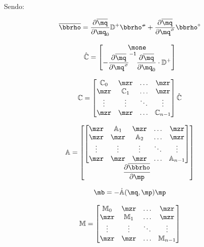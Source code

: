 \documentclass[a4paper,11pt,brazil,fleqn]{article}
\begin{document}
Sendo:

\begin{equation} \label{eq:VinculosVelocidades}
\overline{\mrho} = \frac{\partial \overline{\mq}}{\partial \mq_0} \mD^+ \mrho\ssh + \frac{\partial \overline{\mq}}{\partial \mq\hcir}  \mrho\cir
\end{equation}

\begin{equation} \label{eq:MatrizCchapeu}
\hat{\mC} = \begin{bmatrix}
\mone \\
- \displaystyle\frac{\partial \overline{\mq}}{\partial \mq\hcir}^\msI  \frac{\partial \overline{\mq}}{\partial \mq_0 }\cdot\mD^+
\end{bmatrix}
\end{equation}

\begin{equation} \label{eq:MatrizC2}
\mC = 
\begin{bmatrix}
\mC_0 &  \mzr  & \ldots & \mzr\\
\mzr  &  \mC_1 & \ldots & \mzr\\
\vdots & \vdots & \ddots & \vdots\\
\mzr  &   \mzr       &\ldots & \mC_{n-1}
\end{bmatrix}
\hat{\mC}
\end{equation}

\begin{equation} \label{eq:MatrizA2}
\mA = 
\begin{bmatrix}
\begin{bmatrix}
\mzr &  \mA_1  & \mzr & \ldots & \mzr\\
\mzr  &  \mzr & \mA_2 & \ldots & \mzr\\
\vdots & \vdots & \vdots & \ddots & \vdots\\
\mzr  &   \mzr  & \mzr     &\ldots & \mA_{n-1}
\end{bmatrix} \\
\displaystyle\frac{\partial \overline{\mrho}}{\partial \mp}
\end{bmatrix}
\end{equation}

\begin{equation} \label{eq:Matrizb2}
\mb = - \dot{\mA}(\mq,\mp) \mp
\end{equation}

\begin{equation} \label{eq:MatrizM2}
\mM =
\begin{bmatrix}
\mM_0 &  \mzr  & \ldots & \mzr\\
\mzr  &  \mM_1 & \ldots & \mzr\\
\vdots & \vdots & \ddots & \vdots\\
\mzr  &   \mzr       &\ldots & \mM_{n-1}
\end{bmatrix}
\end{equation}
\end{document}
